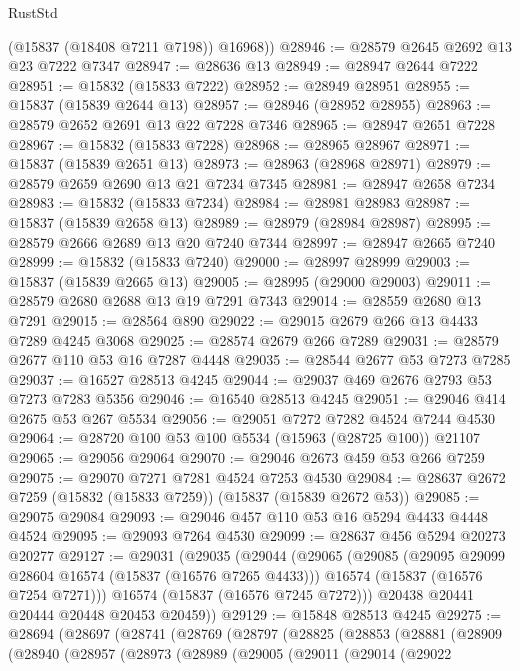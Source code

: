 \begin{lexlean}{RustStd}
\begin{coremodule}
        (@15837 (@18408 @7211 @7198))
        @16968))
@28946 := @28579 @2645 @2692 @13 @23 @7222 @7347
@28947 := @28636 @13
@28949 := @28947 @2644 @7222
@28951 := @15832 (@15833 @7222)
@28952 := @28949 @28951
@28955 := @15837 (@15839 @2644 @13)
@28957 := @28946 (@28952 @28955)
@28963 := @28579 @2652 @2691 @13 @22 @7228 @7346
@28965 := @28947 @2651 @7228
@28967 := @15832 (@15833 @7228)
@28968 := @28965 @28967
@28971 := @15837 (@15839 @2651 @13)
@28973 := @28963 (@28968 @28971)
@28979 := @28579 @2659 @2690 @13 @21 @7234 @7345
@28981 := @28947 @2658 @7234
@28983 := @15832 (@15833 @7234)
@28984 := @28981 @28983
@28987 := @15837 (@15839 @2658 @13)
@28989 := @28979 (@28984 @28987)
@28995 := @28579 @2666 @2689 @13 @20 @7240 @7344
@28997 := @28947 @2665 @7240
@28999 := @15832 (@15833 @7240)
@29000 := @28997 @28999
@29003 := @15837 (@15839 @2665 @13)
@29005 := @28995 (@29000 @29003)
@29011 := @28579 @2680 @2688 @13 @19 @7291 @7343
@29014 := @28559 @2680 @13 @7291
@29015 := @28564 @890
@29022 := @29015 @2679 @266 @13 @4433 @7289 @4245 @3068
@29025 := @28574 @2679 @266 @7289
@29031 := @28579 @2677 @110 @53 @16 @7287 @4448
@29035 := @28544 @2677 @53 @7273 @7285
@29037 := @16527 @28513 @4245
@29044 := @29037 @469 @2676 @2793 @53 @7273 @7283 @5356
@29046 := @16540 @28513 @4245
@29051 := @29046 @414 @2675 @53 @267 @5534
@29056 := @29051 @7272 @7282 @4524 @7244 @4530
@29064 := @28720 @100 @53 @100 @5534 (@15963 (@28725 @100)) @21107
@29065 := @29056 @29064
@29070 := @29046 @2673 @459 @53 @266 @7259
@29075 := @29070 @7271 @7281 @4524 @7253 @4530
@29084 := @28637 @2672 @7259 (@15832 (@15833 @7259)) (@15837 (@15839 @2672 @53))
@29085 := @29075 @29084
@29093 := @29046 @457 @110 @53 @16 @5294 @4433 @4448 @4524
@29095 := @29093 @7264 @4530
@29099 := @28637 @456 @5294 @20273 @20277
@29127 := @29031
    (@29035
      (@29044
        (@29065
          (@29085
            (@29095 @29099 @28604 @16574 (@15837 (@16576 @7265 @4433)))
            @16574
            (@15837 (@16576 @7254 @7271)))
          @16574
          (@15837 (@16576 @7245 @7272)))
        @20438
        @20441
        @20444
        @20448
        @20453
        @20459))
@29129 := @15848 @28513 @4245
@29275 := @28694
    (@28697
      (@28741
        (@28769
          (@28797
            (@28825
              (@28853
                (@28881
                  (@28909
                    (@28940
                      (@28957
                        (@28973
                          (@28989
                            (@29005
                              (@29011
                                (@29014
                                  (@29022

\end{coremodule}
\end{lexlean}
